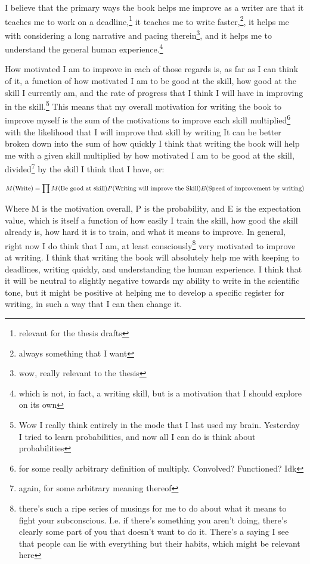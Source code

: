 \documentclass[12pt]{article}[titlepage]
\renewcommand{\,}{\textsuperscript{,}}
\begin{document}
I believe that the primary ways the book helps me improve as a writer are that it teaches me to work on a deadline,\footnote{relevant for the thesis drafts} it teaches me to write faster,\footnote{always something that I want}, it helps me with considering a long narrative and pacing therein\footnote{wow, really relevant to the thesis}, and it helps me to understand the general human experience.\footnote{which is not, in fact, a writing skill, but is a motivation that I should explore on its own}

How motivated I am to improve in each of those regards is, as far as I can think of it, a function of how motivated I am to be good at the skill, how good at the skill I currently am, and the rate of progress that I think I will have in improving in the skill.\footnote{Wow I really think entirely in the mode that I last used my brain. Yesterday I tried to learn probabilities, and now all I can do is think about probabilities}  
This means that my overall motivation for writing the book to improve myself is the sum of the motivations to improve each skill multiplied\footnote{for some really arbitrary definition of multiply. Convolved? Functioned? Idk} with the likelihood that I will improve that skill by writing  
It can be better broken down into the sum of how quickly I think that writing the book will help me with a given skill multiplied by how motivated I am to be good at the skill, divided\footnote{again, for some arbitrary meaning thereof} by the skill I think that I have, or:

\begin{equation}  
M(\textnormal{Write}) = \prod M(\textnormal{Be good at skill}) P(\textnormal{Writing will improve the Skill}) E(\textnormal{Speed of improvement by writing})  
\end{equation}

Where M is the motivation overall, P is the probability, and E is the expectation value, which is itself a function of how easily I train the skill, how good the skill already is, how hard it is to train, and what it means to improve.  
In general, right now I do think that I am, at least consciously\footnote{there's such a ripe series of musings for me to do about what it means to fight your subconscious. I.e. if there's something you aren't doing, there's clearly some part of you that doesn't want to do it. There's a saying I see that people can lie with everything but their habits, which might be relevant here} very motivated to improve at writing.  
I think that writing the book will absolutely help me with keeping to deadlines, writing quickly, and understanding the human experience.  
I think that it will be neutral to slightly negative towards my ability to write in the scientific tone, but it might be positive at helping me to develop a specific register for writing, in such a way that I can then change it.
\end{document}
